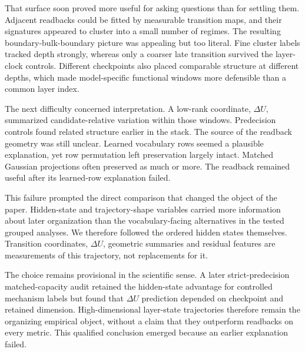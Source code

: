 \documentclass[11pt]{article}
\begin{document}
That surface soon proved more useful for asking questions than for settling them. Adjacent readbacks could be fitted by measurable transition maps, and their signatures appeared to cluster into a small number of regimes. The resulting boundary-bulk-boundary picture was appealing but too literal. Fine cluster labels tracked depth strongly, whereas only a coarser late transition survived the layer-clock controls. Different checkpoints also placed comparable structure at different depths, which made model-specific functional windows more defensible than a common layer index.

The next difficulty concerned interpretation. A low-rank coordinate, \(\Delta U\), summarized candidate-relative variation within those windows. Predecision controls found related structure earlier in the stack. The source of the readback geometry was still unclear. Learned vocabulary rows seemed a plausible explanation, yet row permutation left preservation largely intact. Matched Gaussian projections often preserved as much or more. The readback remained useful after its learned-row explanation failed.

This failure prompted the direct comparison that changed the object of the paper. Hidden-state and trajectory-shape variables carried more information about later organization than the vocabulary-facing alternatives in the tested grouped analyses. We therefore followed the ordered hidden states themselves. Transition coordinates, \(\Delta U\), geometric summaries and residual features are measurements of this trajectory, not replacements for it.

The choice remains provisional in the scientific sense. A later strict-predecision matched-capacity audit retained the hidden-state advantage for controlled mechanism labels but found that \(\Delta U\) prediction depended on checkpoint and retained dimension. High-dimensional layer-state trajectories therefore remain the organizing empirical object, without a claim that they outperform readbacks on every metric. This qualified conclusion emerged because an earlier explanation failed.
\end{document}
